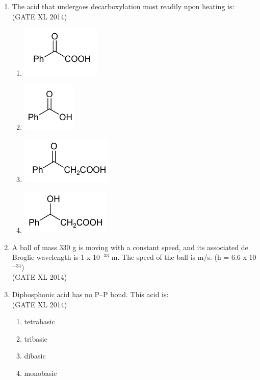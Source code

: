 \documentclass[journal,12pt,onecolumn]{IEEEtran}
\theoremstyle{remark}
\begin{document}
\begin{enumerate}
  \item The acid that undergoes decarboxylation most readily upon heating is: \\
  \hfill (GATE XL 2014)\\
  \begin{multicols}{2}
  \begin{enumerate}
    \item \includegraphics[width=0.2\columnwidth]{fig8.png}
    \item \includegraphics[width=0.2\columnwidth]{fig9.png}
    \item \includegraphics[width=0.3\columnwidth]{fig10.png}
    \item \includegraphics[width=0.3\columnwidth]{fig11.png}
  \end{enumerate}
  \end{multicols}


  \item A ball of mass 330 g is moving with a constant speed, and its associated de Broglie wavelength is 1 x 10$^{-33}$ m. The speed of the ball is \underline{\hspace{2cm}} m/s. (h = 6.6 x 10$^{-34}$)  \\
  \hfill (GATE XL 2014)\\

  \item Diphosphonic acid  has no P–P bond. This acid is: \\
  \hfill (GATE XL 2014)\\
  \begin{multicols}{2}
  \begin{enumerate}
    \item tetrabasic
    \item tribasic
    \item dibasic
    \item monobasic
  \end{enumerate}
  \end{multicols}


\end{enumerate}
\end{document}
